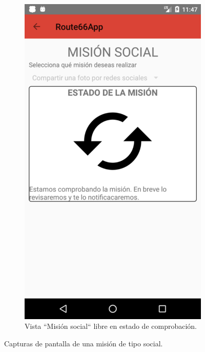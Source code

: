 \documentclass[twoside]{report}
\begin{document}
\begin{figure}[H]
\begin{center}
\begin{subfigure}[t]{.3\linewidth}
		\includegraphics[scale=0.25]{images/userguide/27.png}
		\caption{Vista “Misión social“ libre en estado de comprobación.}
	\end{subfigure}\hspace{2mm}%
\caption{Capturas de pantalla de una misión de tipo social.}
\end{center}
\end{figure}
\end{document}
